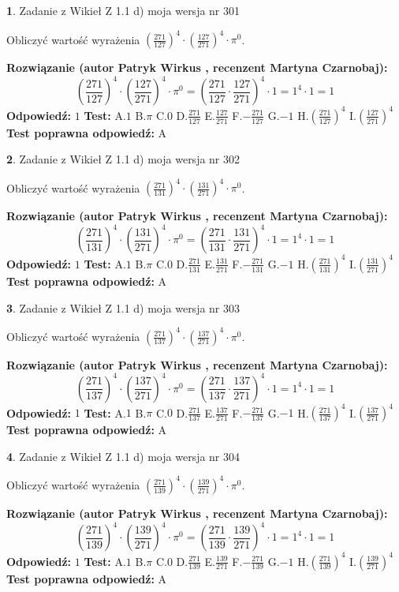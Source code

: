 \documentclass[12pt, a4paper]{article}
\theoremstyle{definition} %
\newtheorem{zad}{}
\newcommand{\zadStart}[1]{\begin{zad}#1\newline}
\newcommand{\zadStop}{\end{zad}}
\newcommand{\rozwStart}[2]{\noindent \textbf{Rozwiązanie (autor #1 , recenzent #2): }\newline}
\newcommand{\rozwStop}{\newline}
\newcommand{\odpStart}{\noindent \textbf{Odpowiedź:}\newline}
\newcommand{\odpStop}{\newline}
\newcommand{\testStart}{\noindent \textbf{Test:}\newline}
\newcommand{\testStop}{\newline}
\newcommand{\kluczStart}{\noindent \textbf{Test poprawna odpowiedź:}\newline}
\newcommand{\kluczStop}{\newline}
\begin{document}
\zadStart{Zadanie z Wikieł Z 1.1 d) moja wersja nr 301}

Obliczyć wartość wyrażenia $(\frac{271}{127})^{4} \cdot (\frac{127}{271})^{4} \cdot \pi^{0}$.
\zadStop
\rozwStart{Patryk Wirkus}{Martyna Czarnobaj}
$$(\frac{271}{127})^{4} \cdot (\frac{127}{271})^{4} \cdot \pi^{0} = (\frac{271}{127} \cdot \frac{127}{271})^{4} \cdot 1 = 1^{4} \cdot 1 = 1$$
\rozwStop
\odpStart
$1$
\odpStop
\testStart
A.$1$ B.$\pi$ C.$0$ D.$\frac{271}{127}$ E.$\frac{127}{271}$
F.$-\frac{271}{127}$ G.$-1$
H.$(\frac{271}{127})^{4}$
I.$(\frac{127}{271})^{4}$
\testStop
\kluczStart
A
\kluczStop



\zadStart{Zadanie z Wikieł Z 1.1 d) moja wersja nr 302}

Obliczyć wartość wyrażenia $(\frac{271}{131})^{4} \cdot (\frac{131}{271})^{4} \cdot \pi^{0}$.
\zadStop
\rozwStart{Patryk Wirkus}{Martyna Czarnobaj}
$$(\frac{271}{131})^{4} \cdot (\frac{131}{271})^{4} \cdot \pi^{0} = (\frac{271}{131} \cdot \frac{131}{271})^{4} \cdot 1 = 1^{4} \cdot 1 = 1$$
\rozwStop
\odpStart
$1$
\odpStop
\testStart
A.$1$ B.$\pi$ C.$0$ D.$\frac{271}{131}$ E.$\frac{131}{271}$
F.$-\frac{271}{131}$ G.$-1$
H.$(\frac{271}{131})^{4}$
I.$(\frac{131}{271})^{4}$
\testStop
\kluczStart
A
\kluczStop



\zadStart{Zadanie z Wikieł Z 1.1 d) moja wersja nr 303}

Obliczyć wartość wyrażenia $(\frac{271}{137})^{4} \cdot (\frac{137}{271})^{4} \cdot \pi^{0}$.
\zadStop
\rozwStart{Patryk Wirkus}{Martyna Czarnobaj}
$$(\frac{271}{137})^{4} \cdot (\frac{137}{271})^{4} \cdot \pi^{0} = (\frac{271}{137} \cdot \frac{137}{271})^{4} \cdot 1 = 1^{4} \cdot 1 = 1$$
\rozwStop
\odpStart
$1$
\odpStop
\testStart
A.$1$ B.$\pi$ C.$0$ D.$\frac{271}{137}$ E.$\frac{137}{271}$
F.$-\frac{271}{137}$ G.$-1$
H.$(\frac{271}{137})^{4}$
I.$(\frac{137}{271})^{4}$
\testStop
\kluczStart
A
\kluczStop



\zadStart{Zadanie z Wikieł Z 1.1 d) moja wersja nr 304}

Obliczyć wartość wyrażenia $(\frac{271}{139})^{4} \cdot (\frac{139}{271})^{4} \cdot \pi^{0}$.
\zadStop
\rozwStart{Patryk Wirkus}{Martyna Czarnobaj}
$$(\frac{271}{139})^{4} \cdot (\frac{139}{271})^{4} \cdot \pi^{0} = (\frac{271}{139} \cdot \frac{139}{271})^{4} \cdot 1 = 1^{4} \cdot 1 = 1$$
\rozwStop
\odpStart
$1$
\odpStop
\testStart
A.$1$ B.$\pi$ C.$0$ D.$\frac{271}{139}$ E.$\frac{139}{271}$
F.$-\frac{271}{139}$ G.$-1$
H.$(\frac{271}{139})^{4}$
I.$(\frac{139}{271})^{4}$
\testStop
\kluczStart
A
\kluczStop
\end{document}
